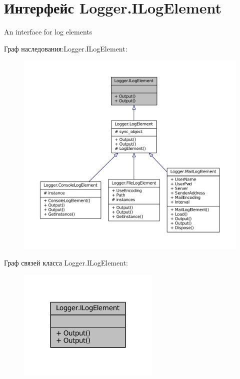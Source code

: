 \hypertarget{interface_logger_1_1_i_log_element}{}\section{Интерфейс Logger.\+I\+Log\+Element}
\label{interface_logger_1_1_i_log_element}


An interface for log elements  




Граф наследования\+:Logger.\+I\+Log\+Element\+:
\nopagebreak
\begin{figure}[H]
\begin{center}
\leavevmode
\includegraphics[width=350pt]{interface_logger_1_1_i_log_element__inherit__graph}
\end{center}
\end{figure}


Граф связей класса Logger.\+I\+Log\+Element\+:
\nopagebreak
\begin{figure}[H]
\begin{center}
\leavevmode
\includegraphics[width=192pt]{interface_logger_1_1_i_log_element__coll__graph}
\end{center}
\end{figure}
